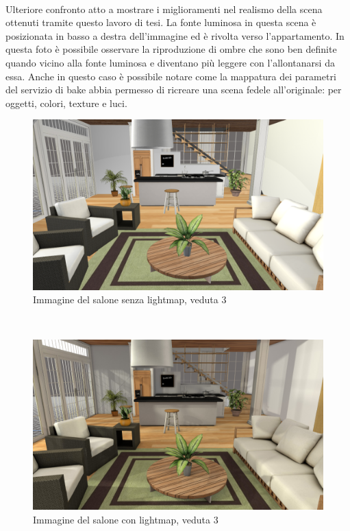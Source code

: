 \\
Ulteriore confronto atto a mostrare i miglioramenti nel realismo della scena ottenuti tramite questo lavoro di tesi.
La fonte luminosa in questa scena è posizionata in basso a destra dell’immagine ed è rivolta verso l’appartamento. In questa foto è possibile osservare la riproduzione di ombre che sono ben definite quando vicino alla fonte luminosa e diventano più leggere con l’allontanarsi da essa.
Anche in questo caso è possibile notare come la mappatura dei parametri del servizio di bake abbia permesso di ricreare una scena fedele all’originale: per oggetti, colori, texture e luci.
\\
\begin{figure}[htb]
 \centering
 \includegraphics[width=0.8\linewidth]{images/chapter_prove_sperimentali/salone_camino_nobake.png}\hfill
 \caption[Salone senza lightmap, veduta 3]{Immagine del salone senza lightmap, veduta 3}
 \label{fig:prove_sperimentali_navigatore_scale_nobake}
\end{figure}
\\
\begin{figure}[htb]
 \centering
 \includegraphics[width=0.8\linewidth]{images/chapter_prove_sperimentali/salone_camino_bake.png}\hfill
 \caption[Salone con lightmap, veduta 3]{Immagine del salone con lightmap, veduta 3}
 \label{fig:prove_sperimentali_navigatore_scale_bake}
\end{figure}
